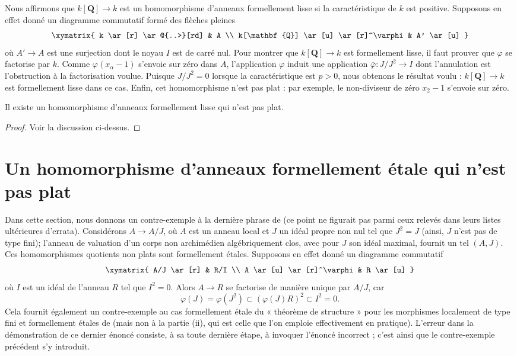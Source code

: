 \medskip\noindent
Nous affirmons que $k[\mathbf{Q}] \to k$ est un homomorphisme d'anneaux formellement lisse
si la caractéristique de $k$ est positive. Supposons en effet donné un
diagramme commutatif formé des flèches pleines
$$
\xymatrix{
k \ar[r] \ar@{..>}[rd] & A \\
k[\mathbf{Q}] \ar[u] \ar[r]^\varphi & A' \ar[u]
}
$$
où $A' \to A$ est une surjection dont le noyau $I$ est de carré nul.
Pour montrer que $k[\mathbf{Q}] \to k$ est formellement lisse, il faut prouver
que $\varphi$ se factorise par $k$. Comme $\varphi(x_\alpha - 1)$ s'envoie
sur zéro dans $A$, l'application $\varphi$ induit une application
$\overline{\varphi} : J/J^2 \to I$ dont l'annulation est l'obstruction
à la factorisation voulue. Puisque $J/J^2 = 0$ lorsque la caractéristique
est $p > 0$, nous obtenons le résultat voulu : $k[\mathbf{Q}] \to k$ est
formellement lisse dans ce cas. Enfin, cet homomorphisme n'est pas plat :
par exemple, le non-diviseur de zéro $x_2 - 1$ s'envoie sur zéro.

\begin{lemma}
\label{lemma-formally-smooth-nonflat}
Il existe un homomorphisme d'anneaux formellement lisse qui n'est pas plat.
\end{lemma}

\begin{proof}
Voir la discussion ci-dessus.
\end{proof}


\section{Un homomorphisme d'anneaux formellement \'etale qui n'est pas plat}
\label{section-formally-etale-nonflat}

\noindent
Dans cette section, nous donnons un contre-exemple à la dernière phrase de
\cite[0, exemple 19.10.3(i)]{EGA} (ce point ne figurait pas parmi ceux relevés
dans leurs listes ultérieures d'errata). Considérons $A \to A/J$, où $A$ est un anneau local
et $J$ un idéal propre non nul tel que $J^2 = J$ (ainsi, $J$ n'est pas de type
fini); l'anneau de valuation d'un corps non archimédien algébriquement clos,
avec pour $J$ son idéal maximal, fournit un tel $(A, J)$. Ces
homomorphismes quotients non plats sont formellement \'etales. Supposons en effet donné un
diagramme commutatif
$$
\xymatrix{
A/J \ar[r] & R/I \\
A \ar[u] \ar[r]^\varphi & R \ar[u]
}
$$
où $I$ est un idéal de l'anneau $R$ tel que $I^2 = 0$. Alors $A \to R$
se factorise de manière unique par $A/J$, car
$$
\varphi(J) = \varphi(J^2) \subset (\varphi(J)R)^2 \subset I^2 = 0.
$$
Cela fournit également un contre-exemple au cas formellement \'etale
du « théorème de structure » pour les morphismes localement de type fini et formellement \'etales
de \cite[IV, théorème 18.4.6(i)]{EGA}
(mais non à la partie (ii), qui est celle que l'on emploie effectivement
en pratique). L'erreur dans la démonstration de ce dernier énoncé
consiste, à sa toute dernière étape, à invoquer l'énoncé incorrect
\cite[0, exemple 19.3.10(i)]{EGA};
c'est ainsi que le contre-exemple précédent s'y introduit.

